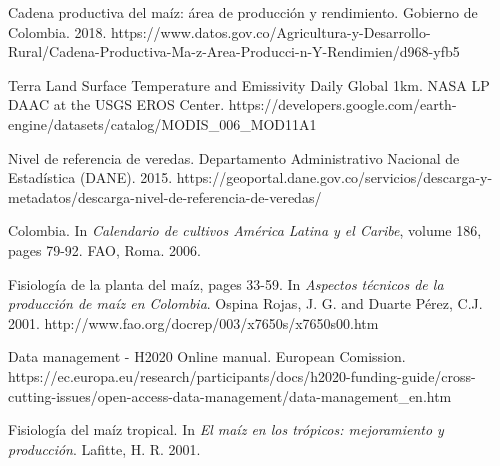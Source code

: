 \documentclass[12pt, spanish]{article}
\begin{document}
\begin{thebibliography}{99}
 Cadena productiva del maíz: área de producción y rendimiento. Gobierno de Colombia. 2018. https://www.datos.gov.co/Agricultura-y-Desarrollo-Rural/Cadena-Productiva-Ma-z-Area-Producci-n-Y-Rendimien/d968-yfb5

 Terra Land Surface Temperature and Emissivity Daily Global 1km. NASA LP DAAC at the USGS EROS Center. https://developers.google.com/earth-engine/datasets/catalog/MODIS\_006\_MOD11A1

 Nivel de referencia de veredas. Departamento Administrativo Nacional de Estadística (DANE). 2015. https://geoportal.dane.gov.co/servicios/descarga-y-metadatos/descarga-nivel-de-referencia-de-veredas/

 Colombia. In \textit{Calendario de cultivos América Latina y el Caribe}, volume 186, pages 79-92. FAO, Roma. 2006.

 Fisiología de la planta del maíz, pages 33-59. In \textit{Aspectos técnicos de la producción de maíz en Colombia}. Ospina Rojas, J. G. and Duarte Pérez, C.J. 2001. http://www.fao.org/docrep/003/x7650s/x7650s00.htm

 Data management - H2020 Online manual. European Comission. https://ec.europa.eu/research/participants/docs/h2020-funding-guide/cross-cutting-issues/open-access-data-management/data-management\_en.htm

 Fisiología del maíz tropical. In \textit{El maíz en los trópicos: mejoramiento y producción}. Lafitte, H. R. 2001.



\end{thebibliography}



\end{document}
